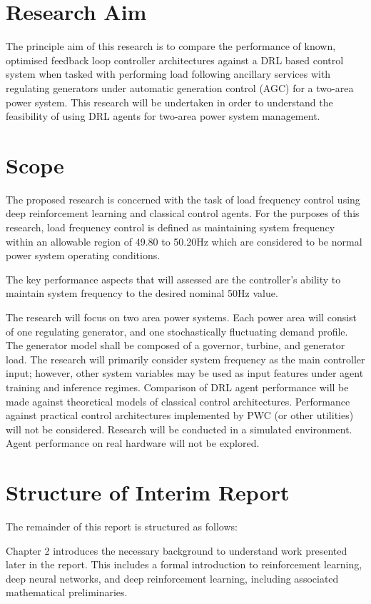 \section{Research Aim}
The principle aim of this research is to compare the performance of known, optimised feedback loop controller architectures against a DRL based control system when tasked with performing load following ancillary services with regulating generators under automatic generation control (AGC) for a two-area power system. This research will be undertaken in order to understand the feasibility of using DRL agents for two-area power system management.

\section{Scope}
The proposed research is concerned with the task of load frequency control using deep reinforcement learning and classical control agents. For the purposes of this research, load frequency control is defined as maintaining system frequency within an allowable region of 49.80 to 50.20$\si{\hertz}$ which are considered to be normal power system operating conditions.

The key performance aspects that will assessed are the controller's ability to maintain system frequency to the desired nominal 50$\si{\hertz}$ value.

The research will focus on two area power systems. Each power area will consist of one regulating generator, and one stochastically fluctuating demand profile. The generator model shall be composed of a governor, turbine, and generator load. The research will primarily consider system frequency as the main controller input; however, other system variables may be used as input features under agent training and inference regimes. Comparison of DRL agent performance will be made against theoretical models of classical control architectures. Performance against practical control architectures implemented by PWC (or other utilities) will not be considered. Research will be conducted in a simulated environment. Agent performance on real hardware will not be explored.

\section{Structure of Interim Report}
The remainder of this report is structured as follows:

Chapter 2 introduces the necessary background to understand work presented later in the report. This includes a formal introduction to reinforcement learning, deep neural networks, and deep reinforcement learning, including associated mathematical preliminaries.

